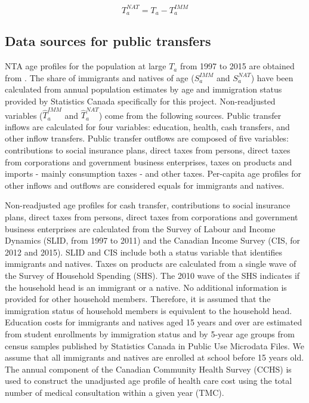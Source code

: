 \begin{equation}\label{eq:nat}
 {T}^{NAT}_a ={T}_a -{T}^{IMM}_a
\end{equation}

\subsection*{Data sources for public transfers}

NTA age profiles for the population at large \({T}_a \) from 1997 to 2015 are obtained from  \citet{Merette:2019kz}.
The share of immigrants and natives of age (\( S^{IMM}_a \) and \( S^{NAT}_a \)) have been calculated from annual population estimates by age and immigration status provided by Statistics Canada specifically for this project.
Non-readjusted variables (\(\hat{T}^{IMM}_a \) and \(\hat{T}^{NAT}_a \)) come from the following sources.
Public transfer inflows are calculated for four variables: education, health, cash transfers, and other inflow transfers.
Public transfer outflows are composed of five variables: contributions to social insurance plans, direct taxes from persons, direct taxes from corporations and government business enterprises, taxes on products and imports - mainly consumption taxes - and other taxes.
Per-capita age profiles for other inflows and outflows are considered equals for immigrants and natives.

\vspace{0.7em}\par
Non-readjusted age profiles for cash transfer, contributions to social insurance plans, direct taxes from persons, direct taxes from corporations and government business enterprises are calculated from the Survey of Labour and Income Dynamics (SLID, from 1997 to 2011) and the Canadian Income Survey (CIS, for 2012 and 2015).
SLID and CIS include both a status variable that identifies immigrants and natives.
Taxes on products are calculated from a single wave of the Survey of Household Spending (SHS).
The 2010 wave of the SHS indicates if the household head is an immigrant or a native.
No additional information is provided for other household members.
Therefore, it is assumed that the immigration status of household members is equivalent to the household head.
Education costs for immigrants and natives aged 15 years and over are estimated from student enrollments by immigration status and by 5-year age groups from census samples published by Statistics Canada in Public Use Microdata Files.
We assume that all immigrants and natives are enrolled at school before 15 years old.
The annual component of the Canadian Community Health Survey (CCHS) is used to construct the unadjusted age profile of health care cost using the total number of medical consultation within a given year (TMC).

